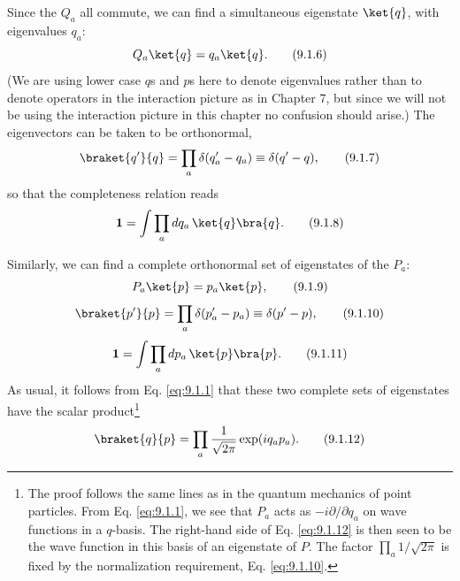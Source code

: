 Since the $Q_a$ all commute, we can find a simultaneous eigenstate
$\ket{q}$, with eigenvalues $q_a$:
\begin{equation}
  Q_a\ket{q}=q_a\ket{q}.
  \tag{9.1.6}\label{eq:9.1.6}
\end{equation}
(We are using lower case $q$s and $p$s here to denote eigenvalues rather
than to denote operators in the interaction picture as in Chapter 7, but
since we will not be using the interaction picture in this chapter no
confusion should arise.) The eigenvectors can be taken to be orthonormal,
\begin{equation}
  \braket{q'}{q}=\prod_a\delta(q'_a-q_a)\equiv\delta(q'-q),
  \tag{9.1.7}\label{eq:9.1.7}
\end{equation}
so that the completeness relation reads
\begin{equation}
  \mathbf{1}=\int\prod_a dq_a\,\ket{q}\bra{q}.
  \tag{9.1.8}\label{eq:9.1.8}
\end{equation}

Similarly, we can find a complete orthonormal set of eigenstates of the
$P_a$:
\begin{equation}
  P_a\ket{p}=p_a\ket{p},
  \tag{9.1.9}\label{eq:9.1.9}
\end{equation}
\begin{equation}
  \braket{p'}{p}=\prod_a\delta(p'_a-p_a)\equiv\delta(p'-p),
  \tag{9.1.10}\label{eq:9.1.10}
\end{equation}
\begin{equation}
  \mathbf{1}=\int\prod_a dp_a\,\ket{p}\bra{p}.
  \tag{9.1.11}\label{eq:9.1.11}
\end{equation}
As usual, it follows from Eq. \eqref{eq:9.1.1} that these two complete sets of
eigenstates have the scalar product\footnote{The proof follows the same lines
as in the quantum mechanics of point particles. From Eq. \eqref{eq:9.1.1}, we see
that $P_a$ acts as $-i\partial/\partial q_a$ on wave functions in a $q$-basis.
The right-hand side of Eq. \eqref{eq:9.1.12} is then seen to be the wave function in
this basis of an eigenstate of $P$. The factor $\prod_a1/\sqrt{2\pi}$ is fixed
by the normalization requirement, Eq. \eqref{eq:9.1.10}.}
\begin{equation}
  \braket{q}{p}=\prod_a\frac{1}{\sqrt{2\pi}}\exp(iq_ap_a).
  \tag{9.1.12}\label{eq:9.1.12}
\end{equation}


